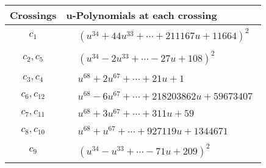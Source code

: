 \documentclass[1p]{elsarticle_modified}
\theoremstyle{definition}
\begin{document}
\begin{tabular}{m{50pt}|m{274pt}}
Crossings & \hspace{64pt}u-Polynomials at each crossing \\
\hline $$\begin{aligned}c_{1}\end{aligned}$$&$\begin{aligned}
&(u^{34}+44 u^{33}+\cdots+211167 u+11664)^{2}
\end{aligned}$\\
\hline $$\begin{aligned}c_{2},c_{5}\end{aligned}$$&$\begin{aligned}
&(u^{34}-2 u^{33}+\cdots-27 u+108)^{2}
\end{aligned}$\\
\hline $$\begin{aligned}c_{3},c_{4}\end{aligned}$$&$\begin{aligned}
&u^{68}+2 u^{67}+\cdots+21 u+1
\end{aligned}$\\
\hline $$\begin{aligned}c_{6},c_{12}\end{aligned}$$&$\begin{aligned}
&u^{68}-6 u^{67}+\cdots+218203862 u+59673407
\end{aligned}$\\
\hline $$\begin{aligned}c_{7},c_{11}\end{aligned}$$&$\begin{aligned}
&u^{68}+3 u^{67}+\cdots+311 u+59
\end{aligned}$\\
\hline $$\begin{aligned}c_{8},c_{10}\end{aligned}$$&$\begin{aligned}
&u^{68}+u^{67}+\cdots+927119 u+1344671
\end{aligned}$\\
\hline $$\begin{aligned}c_{9}\end{aligned}$$&$\begin{aligned}
&(u^{34}- u^{33}+\cdots-71 u+209)^{2}
\end{aligned}$\\
\hline
\end{tabular}\\~\\
\end{document}
